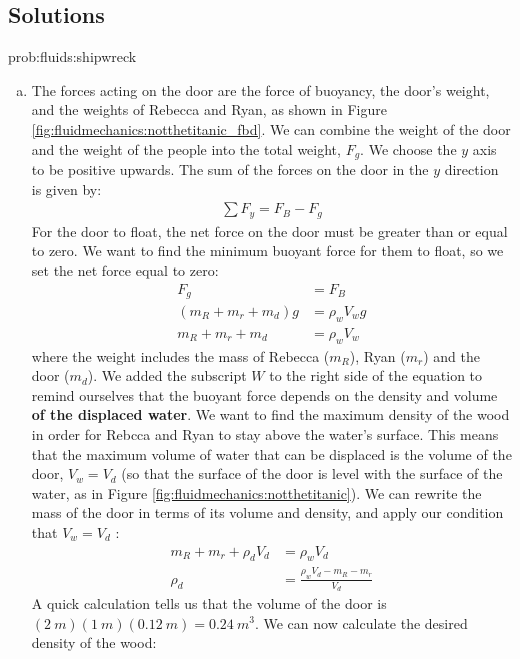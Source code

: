 {{\subsection{Solutions}
\begin{solution}{prob:fluids:shipwreck}\label{soln:fluids:shipwreck}
\begin{enumerate}[(a)]
\item The forces acting on the door are the force of buoyancy, the door's weight, and the weights of Rebecca and Ryan, as shown in Figure \ref{fig:fluidmechanics:notthetitanic_fbd}. 
We can combine the weight of the door and the weight of the people into the total weight, $F_g$. We choose the $y$ axis to be positive upwards. The sum of the forces on the door in the $y$ direction is given by:
\begin{align*}
\sum F_y = F_B- F_g
\end{align*}
For the door to float, the net force on the door must be greater than or equal to zero. We want to find the minimum buoyant force for them to float, so we set the net force equal to zero:
\begin{align*}
F_g&=F_B\\
(m_R+m_r+m_d)g&=\rho_wV_wg\\
m_R+m_r+m_d&=\rho_wV_w
\end{align*}
where the weight includes the mass of Rebecca ($m_R$), Ryan ($m_r$) and the door ($m_d$). We added the subscript $W$ to the right side of the equation to remind ourselves that the buoyant force depends on the density and volume \textbf{of the displaced water}. We want to find the maximum density of the wood in order for Rebcca and Ryan to stay above the water's surface. This means that the maximum volume of water that can be displaced is the volume of the door, $V_w=V_d$ (so that the surface of the door is level with the surface of the water, as in Figure \ref{fig:fluidmechanics:notthetitanic}). We can rewrite the mass of the door in terms of its volume and density, and apply our condition that $V_w=V_d$ :
\begin{align*}
m_R+m_r+\rho_dV_d&=\rho_wV_d\\
\rho_d&=\frac{\rho_wV_d-m_R-m_r}{V_d}
\end{align*}
A quick calculation tells us that the volume of the door is $(\SI{2}{m})(\SI{1}{m})(\SI{0.12}{m})=\SI{0.24}{m^3}$. We can now calculate the desired density of the wood:

\end{enumerate}
\end{solution}}}
